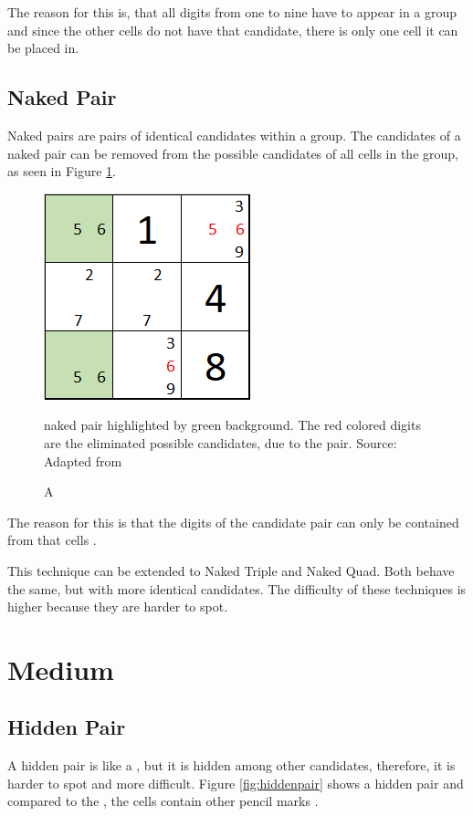 \documentclass[twoside]{ausarbeitung}
\begin{document}
The reason for this is, that all digits from one to nine have to appear in a group and since the other cells do not have that candidate, there is only one cell it can be placed in.

\subsection{Naked Pair} \label{ss:npair}
Naked pairs are pairs of identical candidates within a group. The candidates of a naked pair can be removed from the possible candidates of all cells in the group, as seen in Figure \ref{fig:nakedpair}. 

\begin{figure}[H]
  \centering
  \includegraphics[width=.25\linewidth]{images/nakedpair}
  \caption[Naked Pair] A naked pair highlighted by green background. The red colored digits are the eliminated possible candidates, due to the pair. Source: Adapted from \cite{NakedPai2:online}
  \label{fig:nakedpair}
\end{figure}%

The reason for this is that the digits of the candidate pair can only be contained from that cells \cite{NakedPai2:online}.

This technique can be extended to Naked Triple and Naked Quad. Both behave the same, but with more identical candidates. The difficulty of these techniques is higher because they are harder to spot.













\section{Medium}

\subsection{Hidden Pair} \label{ss:hpair}
A hidden pair is like a , but it is hidden among other candidates, therefore, it is harder to spot and more difficult. Figure \ref{fig:hiddenpair} shows a hidden pair and compared to the , the cells contain other pencil marks \cite{SudokuHi85:online}.
\end{document}
